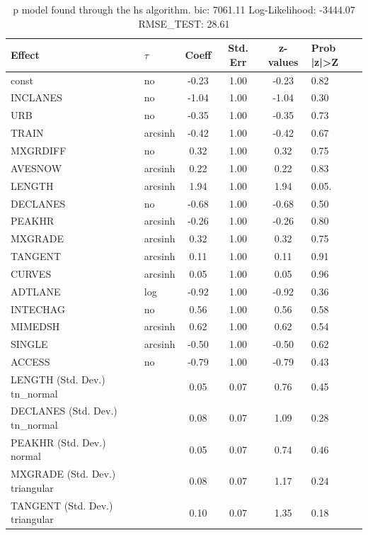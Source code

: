 \begin{table}
	\caption{p model found through the hs algorithm. bic: 7061.11 Log-Likelihood: -3444.07 RMSE_TEST: 28.61}
	\begin{center}
		\begin{tabular}{|l|l|c|c|c|l|}
			\hline
			Effect & $\tau$ & Coeff & Std. Err & z-values & Prob |z|>Z \\
			\hline
			const & no & -0.23 & 1.00 & -0.23 & 0.82 \\
			\hline
			INCLANES & no & -1.04 & 1.00 & -1.04 & 0.30 \\
			\hline
			URB & no & -0.35 & 1.00 & -0.35 & 0.73 \\
			\hline
			TRAIN & arcsinh & -0.42 & 1.00 & -0.42 & 0.67 \\
			\hline
			MXGRDIFF & no & 0.32 & 1.00 & 0.32 & 0.75 \\
			\hline
			AVESNOW & arcsinh & 0.22 & 1.00 & 0.22 & 0.83 \\
			\hline
			LENGTH & arcsinh & 1.94 & 1.00 & 1.94 & 0.05. \\
			\hline
			DECLANES & no & -0.68 & 1.00 & -0.68 & 0.50 \\
			\hline
			PEAKHR & arcsinh & -0.26 & 1.00 & -0.26 & 0.80 \\
			\hline
			MXGRADE & arcsinh & 0.32 & 1.00 & 0.32 & 0.75 \\
			\hline
			TANGENT & arcsinh & 0.11 & 1.00 & 0.11 & 0.91 \\
			\hline
			CURVES & arcsinh & 0.05 & 1.00 & 0.05 & 0.96 \\
			\hline
			ADTLANE & log & -0.92 & 1.00 & -0.92 & 0.36 \\
			\hline
			INTECHAG & no & 0.56 & 1.00 & 0.56 & 0.58 \\
			\hline
			MIMEDSH & arcsinh & 0.62 & 1.00 & 0.62 & 0.54 \\
			\hline
			SINGLE & arcsinh & -0.50 & 1.00 & -0.50 & 0.62 \\
			\hline
			ACCESS & no & -0.79 & 1.00 & -0.79 & 0.43 \\
			\hline
			LENGTH (Std. Dev.) tn_normal &  & 0.05 & 0.07 & 0.76 & 0.45 \\
			\hline
			DECLANES (Std. Dev.) tn_normal &  & 0.08 & 0.07 & 1.09 & 0.28 \\
			\hline
			PEAKHR (Std. Dev.) normal &  & 0.05 & 0.07 & 0.74 & 0.46 \\
			\hline
			MXGRADE (Std. Dev.) triangular &  & 0.08 & 0.07 & 1.17 & 0.24 \\
			\hline
			TANGENT (Std. Dev.) triangular &  & 0.10 & 0.07 & 1.35 & 0.18 \\

\end{tabular}
\end{center}
\end{table}
